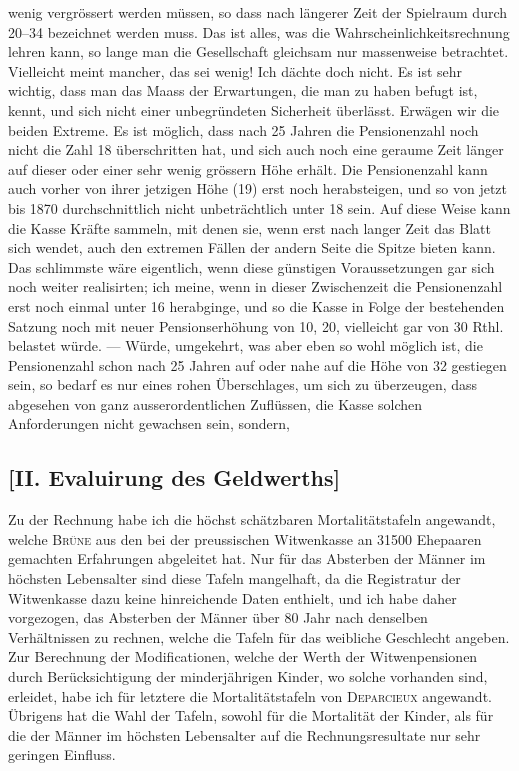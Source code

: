 \documentclass[12pt,a4paper]{article}
\begin{document}
wenig vergrössert werden müssen, so dass nach längerer Zeit der Spielraum durch 20--34 bezeichnet werden muss. Das ist alles, was die Wahrscheinlichkeitsrechnung lehren kann, so lange man die Gesellschaft gleichsam nur massenweise betrachtet. Vielleicht meint mancher, das sei wenig! Ich dächte doch nicht. Es ist sehr wichtig, dass man das Maass der Erwartungen, die man zu haben befugt ist, kennt, und sich nicht einer unbegründeten Sicherheit überlässt. Erwägen wir die beiden Extreme. Es ist möglich, dass nach 25 Jahren die Pensionenzahl noch nicht die Zahl 18 überschritten hat, und sich auch noch eine geraume Zeit länger auf dieser oder einer sehr wenig grössern Höhe erhält. Die Pensionenzahl kann auch vorher von ihrer jetzigen Höhe (19) erst noch herabsteigen, und so von jetzt bis 1870 durchschnittlich nicht unbeträchtlich unter 18 sein. Auf diese Weise kann die Kasse Kräfte sammeln, mit denen sie, wenn erst nach langer Zeit das Blatt sich wendet, auch den extremen Fällen der andern Seite die Spitze bieten kann. Das schlimmste wäre eigentlich, wenn diese günstigen Voraussetzungen gar sich noch weiter realisirten; ich meine, wenn in dieser Zwischenzeit die Pensionenzahl erst noch einmal unter 16 herabginge, und so die Kasse in Folge der bestehenden Satzung noch mit neuer Pensionserhöhung von 10, 20, vielleicht gar von 30 Rthl. belastet würde. --- Würde, umgekehrt, was aber eben so wohl möglich ist, die Pensionenzahl schon nach 25 Jahren auf oder nahe auf die Höhe von 32 gestiegen sein, so bedarf es nur eines rohen Überschlages, um sich zu überzeugen, dass abgesehen von ganz ausserordentlichen Zuflüssen, die Kasse solchen Anforderungen nicht gewachsen sein, sondern,

\subsection*{[II. Evaluirung des Geldwerths]}

Zu der Rechnung habe ich die höchst schätzbaren Mortalitätstafeln angewandt, welche \textsc{Brüne} aus den bei der preussischen Witwenkasse an 31500 Ehepaaren gemachten Erfahrungen abgeleitet hat. Nur für das Absterben der Männer im höchsten Lebensalter sind diese Tafeln mangelhaft, da die Registratur der Witwenkasse dazu keine hinreichende Daten enthielt, und ich habe daher vorgezogen, das Absterben der Männer über 80 Jahr nach denselben Verhältnissen zu rechnen, welche die Tafeln für das weibliche Geschlecht angeben. Zur Berechnung der Modificationen, welche der Werth der Witwenpensionen durch Berücksichtigung der minderjährigen Kinder, wo solche vorhanden sind, erleidet, habe ich für letztere die Mortalitätstafeln von \textsc{Deparcieux} angewandt. Übrigens hat die Wahl der Tafeln, sowohl für die Mortalität der Kinder, als für die der Männer im höchsten Lebensalter auf die Rechnungsresultate nur sehr geringen Einfluss.
\end{document}
